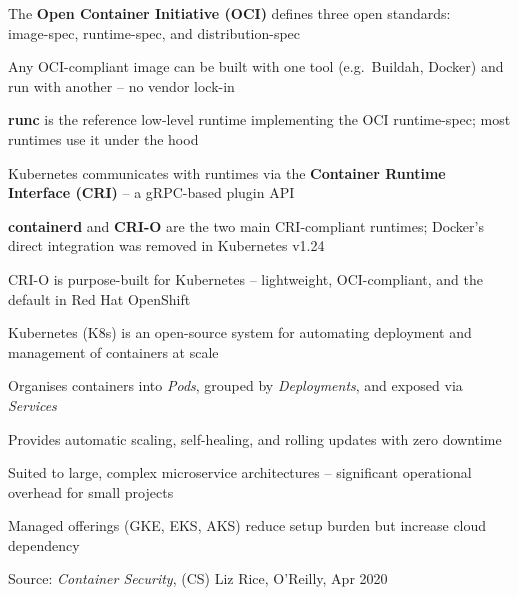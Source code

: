 \documentclass[Screen16to9,17pt]{foils}
\begin{document}
\begin{list2}
\item The {\bf Open Container Initiative (OCI)} defines three open standards:\\
image-spec, runtime-spec, and distribution-spec 
\item Any OCI-compliant image can be built with one tool (e.g.\ Buildah, Docker) and run with another -- no vendor lock-in
\item {\bf runc} is the reference low-level runtime implementing the OCI runtime-spec; most runtimes use it under the hood
\item Kubernetes communicates with runtimes via the {\bf Container Runtime Interface (CRI)} -- a gRPC-based plugin API
\item {\bf containerd} and {\bf CRI-O} are the two main CRI-compliant runtimes; Docker's direct integration was removed in Kubernetes v1.24 
\item CRI-O is purpose-built for Kubernetes -- lightweight, OCI-compliant, and the default in Red Hat OpenShift 
\end{list2}





\begin{list2}
\item Kubernetes (K8s) is an open-source system for automating deployment and management of containers at scale
\item Organises containers into \textit{Pods}, grouped by \textit{Deployments}, and exposed via \textit{Services}
\item Provides automatic scaling, self-healing, and rolling updates with zero downtime
\item Suited to large, complex microservice architectures -- significant operational overhead for small projects
\item Managed offerings (GKE, EKS, AKS) reduce setup burden but increase cloud dependency
\end{list2}


Source: \emph{Container Security}, (CS) Liz Rice, O'Reilly, Apr 2020
\end{document}
